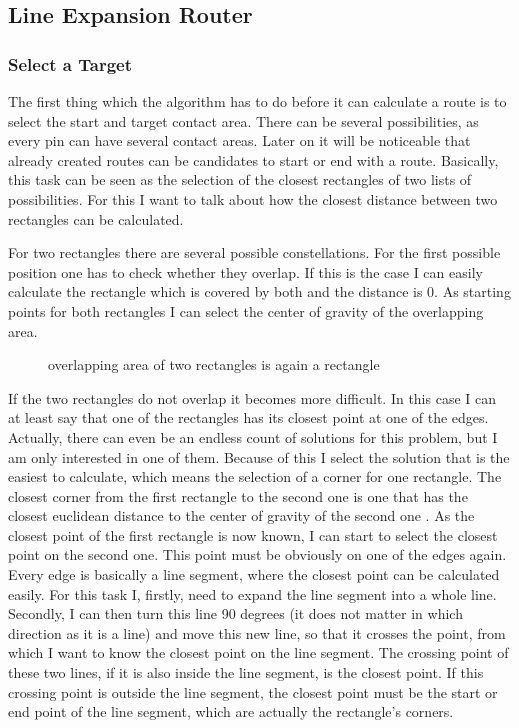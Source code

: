 \subsection{Line Expansion Router}

\subsubsection{Select a Target}
The first thing which the algorithm has to do before it can calculate a route is to select the start and target contact area. There can be several possibilities, as every pin can have several contact areas. Later on it will be noticeable that already created routes can be candidates to start or end with a route. Basically, this task can be seen as the selection of the closest rectangles of two lists of possibilities. For this I want to talk about how the closest distance between two rectangles can be calculated.

For two rectangles there are several possible constellations. For the first possible position one has to check whether they overlap. If this is the case I can easily calculate the rectangle which is covered by both  and the distance is 0. As starting points for both rectangles I can select the center of gravity of the overlapping area.

\begin{figure}
	\centering
	
  	\caption{overlapping area of two rectangles is again a rectangle}
	\label{fig:rectangles_overlapping}
\end{figure}

If the two rectangles do not overlap it becomes more difficult. In this case I can at least say that one of the rectangles has its closest point at one of the edges. Actually, there can even be an endless count of solutions for this problem, but I am only interested in one of them. Because of this I select the solution that is the easiest to calculate, which means the selection of a corner for one rectangle. The closest corner from the first rectangle to the second one is one that has the closest euclidean distance to the center of gravity of the second one . As the closest point of the first rectangle is now known, I can start to select the closest point on the second one. This point must be obviously on one of the edges again. Every edge is basically a line segment, where the closest point can be calculated easily. For this task I, firstly, need to expand the line segment into a whole line. Secondly, I can then turn this line 90 degrees (it does not matter in which direction as it is a line) and move this new line, so that it crosses the point, from which I want to know the closest point on the line segment. The crossing point of these two lines, if it is also inside the line segment, is the closest point. If this crossing point is outside the line segment, the closest point must be the start or end point of the line segment, which are actually the rectangle's corners.

